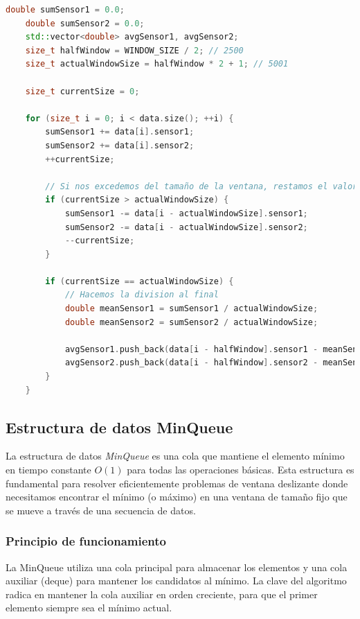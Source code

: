 \documentclass[12pt,a4paper]{article}
\begin{document}
\begin{lstlisting}[language=C++, label=lst:codigo_promedio_movil, caption={normalizer.cpp - Algoritmo optimizado de ventana deslizante con complejidad O(n)}]
    double sumSensor1 = 0.0;
    double sumSensor2 = 0.0;
    std::vector<double> avgSensor1, avgSensor2;
    size_t halfWindow = WINDOW_SIZE / 2; // 2500
    size_t actualWindowSize = halfWindow * 2 + 1; // 5001

    size_t currentSize = 0;

    for (size_t i = 0; i < data.size(); ++i) {
        sumSensor1 += data[i].sensor1;
        sumSensor2 += data[i].sensor2;
        ++currentSize;

        // Si nos excedemos del tamaño de la ventana, restamos el valor mas viejo
        if (currentSize > actualWindowSize) {
            sumSensor1 -= data[i - actualWindowSize].sensor1;
            sumSensor2 -= data[i - actualWindowSize].sensor2;
            --currentSize;
        }

        if (currentSize == actualWindowSize) {
            // Hacemos la division al final
            double meanSensor1 = sumSensor1 / actualWindowSize;
            double meanSensor2 = sumSensor2 / actualWindowSize;

            avgSensor1.push_back(data[i - halfWindow].sensor1 - meanSensor1);
            avgSensor2.push_back(data[i - halfWindow].sensor2 - meanSensor2);
        }
    }
\end{lstlisting}

\subsection{Estructura de datos MinQueue}

La estructura de datos \textit{MinQueue} es una cola que mantiene el elemento mínimo en tiempo constante $O(1)$ para todas las operaciones básicas. Esta estructura es fundamental para resolver eficientemente problemas de ventana deslizante donde necesitamos encontrar el mínimo (o máximo) en una ventana de tamaño fijo que se mueve a través de una secuencia de datos.

\subsubsection{Principio de funcionamiento}

La MinQueue utiliza una cola principal para almacenar los elementos y una cola auxiliar (deque) para mantener los candidatos al mínimo. La clave del algoritmo radica en mantener la cola auxiliar en orden creciente, para que el primer elemento siempre sea el mínimo actual.
\end{document}
